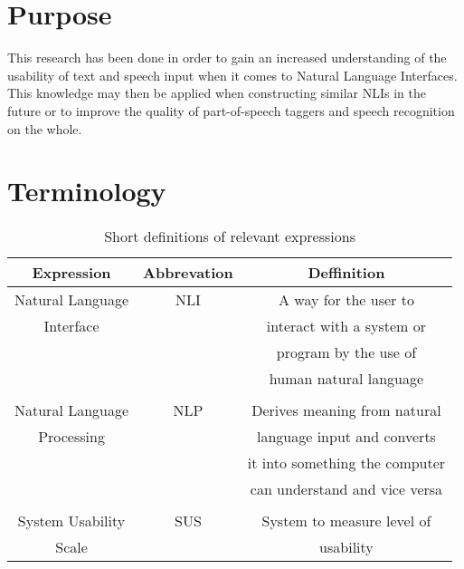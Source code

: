 \section{Purpose}
This research has been done in order to gain an increased understanding of the usability of text and speech input when it comes to Natural Language Interfaces. This knowledge may then be applied when constructing similar NLIs in the future or to improve the quality of part-of-speech taggers and speech recognition on the whole.


\section{Terminology}

\begin{table}[ht]
  \centering
  \begin{tabular}{ccc}
    \toprule
    Expression & Abbrevation & Deffinition\\
    \midrule
    Natural Language & NLI & A way for the user to\\
    Interface & & interact with a system or\\ 
    & & program by the use of\\
    & & human natural language\\
    \\
    Natural Language & NLP & Derives meaning from natural\\
    Processing & & language input and converts\\
    & & it into something the computer\\
    & & can understand and vice versa\\
    \\
    System Usability & SUS & System to measure level of\\
    Scale & &  usability\\
    \bottomrule
  \end{tabular}
  \caption{Short definitions of relevant expressions}\label{termin}
\end{table}